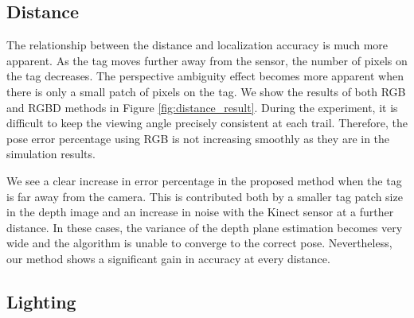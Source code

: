 \subsection{Distance}

The relationship between the distance and localization accuracy is much more apparent. As the tag moves further away from the sensor, the number of pixels on the tag decreases. The perspective ambiguity effect becomes more apparent when there is only a small patch of pixels on the tag. We show the results of  both RGB and RGBD methods in Figure \ref{fig:distance_result}. During the experiment, it is difficult to keep the viewing angle precisely consistent at each trail. Therefore, the pose error percentage using RGB is not increasing smoothly as they are in the simulation results.

We see a clear increase in error percentage in the proposed method when the tag is far away from the camera. This is contributed both by a smaller tag patch size in the depth image and an increase in noise with the Kinect sensor at a further distance. In these cases, the variance of the depth plane estimation becomes very wide and the algorithm is unable to converge to the correct pose. Nevertheless, our method shows a significant gain in accuracy at every distance.

\subsection{Lighting}

